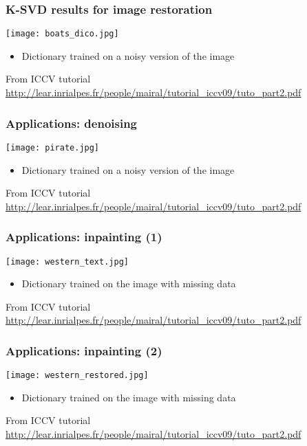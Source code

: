 \documentclass[compress, smaller, serif, 9pt]{beamer}
\begin{document}
\begin{frame}
  \frametitle{K-SVD results  for image restoration}
  \begin{center}
   \texttt{[image: boats\_dico.jpg]}%
  \end{center}
  \begin{itemize}
   \item  Dictionary trained on a \alert{noisy} version of the image
  \end{itemize}
From ICCV tutorial\\ {\small \url{http://lear.inrialpes.fr/people/mairal/tutorial_iccv09/tuto_part2.pdf}}
\end{frame}

\begin{frame}
  \frametitle{Applications: denoising}
  \begin{center}
   \texttt{[image: pirate.jpg]}%
  \end{center}
  \begin{itemize}
   \item  Dictionary trained on a \alert{noisy} version of the image
  \end{itemize}
From ICCV tutorial\\ {\small \url{http://lear.inrialpes.fr/people/mairal/tutorial_iccv09/tuto_part2.pdf}}
\end{frame}

\begin{frame}
  \frametitle{Applications: inpainting (1)}
  \begin{center}
   \texttt{[image: western\_text.jpg]}%
  \end{center}
  \begin{itemize}
   \item  Dictionary trained on the image with \alert{missing} data
  \end{itemize}
  \scriptsize{
From ICCV tutorial  \url{http://lear.inrialpes.fr/people/mairal/tutorial_iccv09/tuto_part2.pdf}}
\end{frame}

\begin{frame}
  \frametitle{Applications: inpainting (2)}
  \begin{center}
   \texttt{[image: western\_restored.jpg]}%
  \end{center}
  \begin{itemize}
   \item  Dictionary trained on the image with \alert{missing} data
  \end{itemize}
  \scriptsize{
From ICCV tutorial  \url{http://lear.inrialpes.fr/people/mairal/tutorial_iccv09/tuto_part2.pdf}}
\end{frame}
\end{document}
